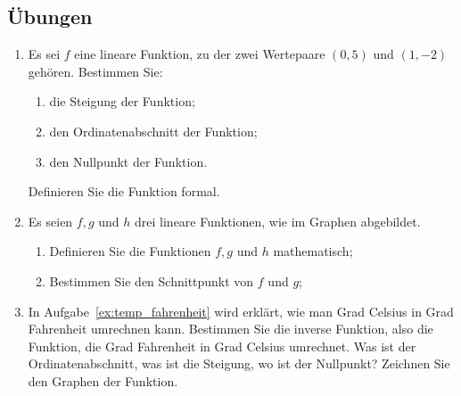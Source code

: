 \documentclass[12pt]{article}
\begin{document}
\subsection{Übungen}
\begin{exercise}
\begin{enumerate}[label=\alph*)]
\item Es sei $f$ eine lineare Funktion, zu der zwei Wertepaare $(0,5)$ und $(1,-2)$ gehören. Bestimmen Sie: \begin{enumerate}[label=\roman*)]
\item die Steigung der Funktion;
\item den Ordinatenabschnitt der Funktion;
\item den Nullpunkt der Funktion.
\end{enumerate}
Definieren Sie die Funktion formal.
\item Es seien $f, g$ und $h$ drei lineare Funktionen, wie im Graphen abgebildet.
\begin{enumerate}[label=\roman*)]
\item Definieren Sie die Funktionen $f, g$ und $h$ mathematisch;
\item Bestimmen Sie den Schnittpunkt von $f$ und $g$;
\end{enumerate}
\begin{center}
\end{center}
\item In Aufgabe~\ref{ex:temp_fahrenheit} wird erklärt, wie man Grad Celsius in Grad Fahrenheit umrechnen kann. Bestimmen Sie die inverse Funktion, also die Funktion, die Grad Fahrenheit in Grad Celsius umrechnet. Was ist der Ordinatenabschnitt, was ist die Steigung, wo ist der Nullpunkt? Zeichnen Sie den Graphen der Funktion.
\begin{center}
\begin{tikzpicture}[>=Stealth, scale=0.5]


\end{tikzpicture}
\end{center}
\end{enumerate}
\end{exercise}
\end{document}
